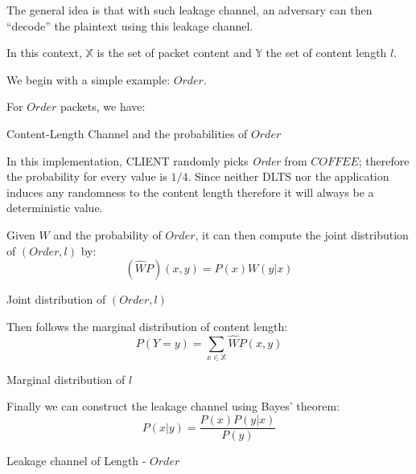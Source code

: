 The general idea is that with such leakage channel, an adversary can then “decode” the plaintext using this leakage channel.

In this context, $\mathbb{X}$ is the set of packet content and $\mathbb{Y}$ the set of content length $l$.

\begin{example} \label{Exmp: Single-Order}
We begin with a simple example: $Order$.

For $Order$ packets, we have:

\begin{table}[H]
\begin{center}
{}
\end{center}
\caption{Content-Length Channel and the probabilities of $Order$}
\label{Tbl: Order1}
\end{table}

In this implementation, CLIENT randomly picks \textit{Order} from $COFFEE$; therefore the probability for every value is $1/4$. Since neither DLTS nor the application induces any randomness to the content length therefore it will always be a deterministic value.

Given $W$ and the probability of $Order$, it can then compute the joint distribution of $(Order, l)$ by:
\begin{equation}
(\widehat{W}P)(x,y) = P(x)W(y|x)
\end{equation}

\begin{table}[H]
\begin{center}
{}
\end{center}
\caption{Joint distribution of $(Order, l)$}
\label{Tbl: Order2}
\end{table}

Then follows the marginal distribution of content length:
\begin{equation}
P(Y=y) = \sum\limits_{x \in \mathbb{X}}{\widehat{W}P(x,y)}
\end{equation}

\begin{table}[H]
\begin{center}
{}
\end{center}
\caption{Marginal distribution of $l$}
\label{Tbl: Order3}
\end{table}

Finally we can construct the leakage channel using Bayes’ theorem:
\begin{equation}
P(x|y) = {\frac {P(x)P(y|x)} {P(y)}} 
\end{equation}
\begin{table}[H]
\begin{center}
{}
\end{center}
\caption{Leakage channel of Length - $Order$}
\label{Tbl: Order4}
\end{table}

\end{example}

